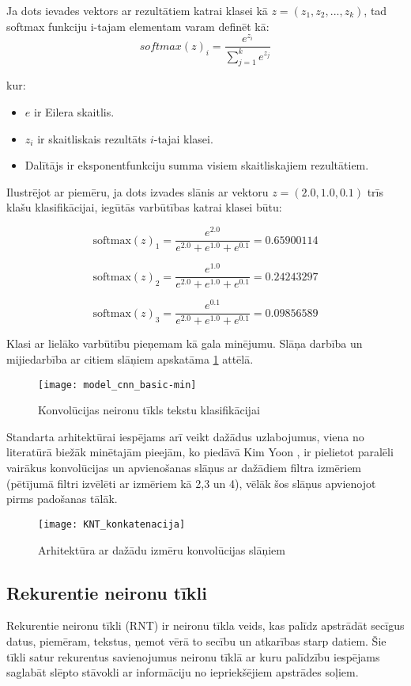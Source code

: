 Ja dots ievades vektors ar rezultātiem katrai klasei kā \(z = (z_1, z_2, ..., z_k)\), tad softmax funkciju i-tajam elementam varam definēt kā:
\begin{equation}
softmax(z)_i = \frac{e^{z_i}}{\sum_{j=1}^{k} e^{z_j}}
\end{equation}

\noindent kur:
\begin{itemize}
\item \(e\) ir Eilera skaitlis.
\item \(z_i\) ir skaitliskais rezultāts \(i\)-tajai klasei.
\item Dalītājs ir eksponentfunkciju summa visiem skaitliskajiem rezultātiem.
\end{itemize}

Ilustrējot ar piemēru, ja dots izvades slānis ar vektoru \(z = (2.0, 1.0, 0.1)\) trīs klašu klasifikācijai, iegūtās varbūtības katrai klasei būtu:

\[ \text{softmax}(z)_1 = \frac{e^{2.0}}{e^{2.0} + e^{1.0} + e^{0.1}} = 0.65900114\]

\[ \text{softmax}(z)_2 = \frac{e^{1.0}}{e^{2.0} + e^{1.0} + e^{0.1}} = 0.24243297\]

\[ \text{softmax}(z)_3 = \frac{e^{0.1}}{e^{2.0} + e^{1.0} + e^{0.1}} = 0.09856589\]

Klasi ar lielāko varbūtību pieņemam kā gala minējumu. Slāņa darbība un mijiedarbība ar citiem slāņiem apskatāma \ref{fig:model_cnn_basic} attēlā.

\begin{figure}[H]
	\texttt{[image: model\_cnn\_basic-min]}
	\caption{Konvolūcijas neironu tīkls tekstu klasifikācijai \cite{TextCNNLena}}
	\label{fig:model_cnn_basic}
\end{figure}

Standarta arhitektūrai iespējams arī veikt dažādus uzlabojumus, viena no literatūrā biežāk minētajām pieejām, ko piedāvā Kim Yoon \cite{kimYoonCNN}, ir pielietot paralēli vairākus konvolūcijas un apvienošanas slāņus ar dažādiem filtra izmēriem (pētījumā filtri izvēlēti ar izmēriem kā 2,3 un 4), vēlāk šos slāņus apvienojot pirms padošanas tālāk.

\begin{figure}[H]
	\texttt{[image: KNT\_konkatenacija]}
	\caption{Arhitektūra ar dažādu izmēru konvolūcijas slāņiem \cite{TextCNNLena}}
	\label{fig:KNT_konkatenacija}
\end{figure}

\subsection{Rekurentie neironu tīkli}
Rekurentie neironu tīkli (RNT) ir neironu tīkla veids, kas palīdz apstrādāt secīgus datus, piemēram, tekstus, ņemot vērā to secību un atkarības starp datiem. Šie tīkli satur rekurentus savienojumus neironu tīklā ar kuru palīdzību iespējams saglabāt slēpto stāvokli ar informāciju no iepriekšējiem apstrādes soļiem.

